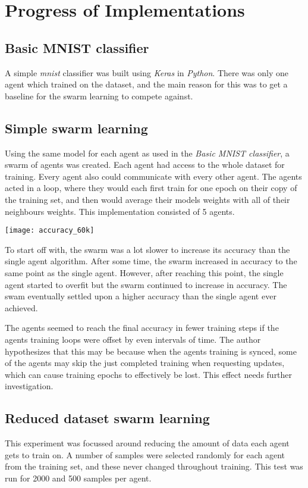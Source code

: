 \chapter{Progress of Implementations}

\section{Basic MNIST classifier}
A simple \emph{mnist} classifier was built using \emph{Keras} in \emph{Python}. There was only one agent which trained on the dataset, and the main reason for this was to get a baseline for the swarm learning to compete against.

\section{Simple swarm learning}
Using the same model for each agent as used in the \emph{Basic MNIST classifier}, a swarm of agents was created. Each agent had access to the whole dataset for training. Every agent also could communicate with every other agent. The agents acted in a loop, where they would each first train for one epoch on their copy of the training set, and then would average their models weights with all of their neighbours weights. This implementation consisted of 5 agents.

\texttt{[image: accuracy\_60k]}

To start off with, the swarm was a lot slower to increase its accuracy than the single agent algorithm. After some time, the swarm increased in accuracy to the same point as the single agent. However, after reaching this point, the single agent started to overfit but the swarm continued to increase in accuracy. The swam eventually settled upon a higher accuracy than the single agent ever achieved.

The agents seemed to reach the final accuracy in fewer training steps if the agents training loops were offset by even intervals of time. The author hypothesizes that this may be because when the agents training is synced, some of the agents may skip the just completed training when requesting updates, which can cause training epochs to effectively be lost. This effect needs further investigation.

\section{Reduced dataset swarm learning}
This experiment was focussed around reducing the amount of data each agent gets to train on. A number of samples were selected randomly for each agent from the training set, and these never changed throughout training. This test was run for 2000 and 500 samples per agent.

